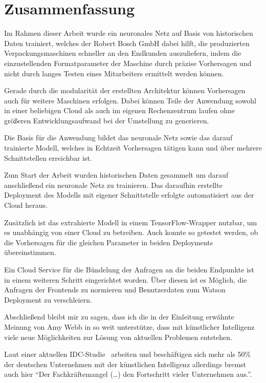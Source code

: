 \chapter{Zusammenfassung}
\label{ch:zusammenfassung}
Im Rahmen dieser Arbeit wurde ein neuronales Netz auf Basis von historischen Daten trainiert, welches der Robert Bosch
GmbH dabei hilft, die produzierten Verpackungsmaschinen schneller an den Endkunden auszuliefern, indem die
einzustellenden Formatparameter der Maschine durch präzise Vorhersagen und nicht durch langes Testen eines Mitarbeiters
ermittelt werden können.

Gerade durch die modularität der erstellten Architektur können Vorhersagen auch für weitere Maschinen erfolgen. Dabei
können Teile der Anwendung sowohl in einer beliebigen Cloud als auch im eigenen Rechenzentrum laufen ohne größeren
Entwicklungsaufwand bei der Umstellung zu generieren.

Die Basis für die Anwendung bildet das neuronale Netz sowie das darauf trainierte Modell, welches in Echtzeit
Vorhersagen tätigen kann und über mehrere Schnittstellen erreichbar ist.

Zum Start der Arbeit wurden historischen Daten gesammelt um darauf anschließend ein neuronale Netz zu trainieren. Das
daraufhin erstellte Deployment des Modells mit eigener Schnittstelle erfolgte automatisiert aus der Cloud heraus.

Zusätzlich ist das extrahierte Modell in einem TensorFlow-Wrapper nutzbar, um es unabhängig von einer Cloud zu
betreiben. Auch konnte so getestet werden, ob die Vorhersagen für die gleichen Parameter in beiden Deployments
übereinstimmen.

Ein Cloud Service für die Bündelung der Anfragen an die beiden Endpunkte ist in einem weiteren Schritt eingerichtet
worden. Über diesen ist es Möglich, die Anfragen der Frontends zu normieren und Benutzerdaten zum Watson Deployment zu
verschleiern.

Abschließend bleibt mir zu sagen, dass ich die in der Einleitung erwähnte Meinung von Amy Webb in so weit unterstütze,
dass mit künstlicher Intelligenz viele neue Möglichkeiten zur Lösung von aktuellen Problemen entstehen.

Laut einer aktuellen IDC-Studie~\cite{article_zusammenfassung_idc} arbeiten und beschäftigen sich mehr als 50\% der
deutschen Unternehmen mit der künstlichen Intelligenz allerdings bremst auch hier \enquote{Der Fachkräftemangel (\ldots)
den Fortschritt vieler Unternehmen aus.}.
